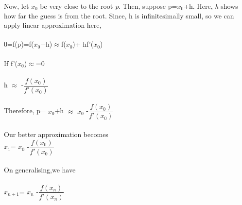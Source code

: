 \documentclass[15pt]{report}
\begin{document}
Now, let $x_{0}$ be very close to the root \textit{p}. Then, suppose p=$x_{0}$+h. Here, \textit{h} shows how far the guess is from the root.
Since, h is infinitesimally small, so we can apply linear approximation here,\\ \\
0=f(p)=f($x_{0}$+h)$\approx$f($x_{0}$)+ hf'($x_{0}$)\\ \\
If f'($x_{0}$)$\approx$=0\\ \\
h $\approx$ -$\dfrac{f(x_{0})}{f'(x_{0})}$\\ \\
Therefore, p= $x_{0}$+h $\approx$ $x_{0}$ -$\dfrac{f(x_{0})}{f'(x_{0})}$\\ \\
Our better approximation becomes \\ $x_{1}$=  $x_{0}$ -$\dfrac{f(x_{0})}{f'(x_{0})}$\\ \\
On generalising,we have \\ \\ $x_{n+1}$=  $x_{n}$ -$\dfrac{f(x_{n})}{f'(x_{n})}$\\ \\ \\
\end{document}
